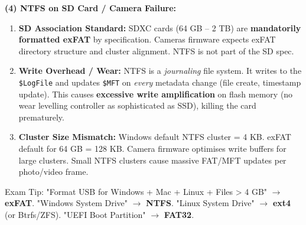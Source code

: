 \documentclass[11pt]{article}
\newcommand{\cle}[1]{{\popxbold\color{popdark}#1}}
\begin{document}
\begin{exoresolu}
\noindent\textbf{(4) NTFS on SD Card / Camera Failure:}
\begin{enumerate}
    \item \textbf{SD Association Standard:} SDXC cards (64 GB -- 2 TB) are \textbf{mandatorily formatted exFAT} by specification. Cameras firmware expects exFAT directory structure and cluster alignment. NTFS is not part of the SD spec.
    \item \textbf{Write Overhead / Wear:} NTFS is a \emph{journaling} file system. It writes to the \texttt{\$LogFile} and updates \texttt{\$MFT} on \emph{every} metadata change (file create, timestamp update). This causes \textbf{excessive write amplification} on flash memory (no wear levelling controller as sophisticated as SSD), killing the card prematurely.
    \item \textbf{Cluster Size Mismatch:} Windows default NTFS cluster = 4 KB. exFAT default for 64 GB = 128 KB. Camera firmware optimises write buffers for large clusters. Small NTFS clusters cause massive FAT/MFT updates per photo/video frame.
\end{enumerate}

\cle{Exam Tip:} "Format USB for Windows + Mac + Linux + Files > 4 GB" $\rightarrow$ \textbf{exFAT}. "Windows System Drive" $\rightarrow$ \textbf{NTFS}. "Linux System Drive" $\rightarrow$ \textbf{ext4} (or Btrfs/ZFS). "UEFI Boot Partition" $\rightarrow$ \textbf{FAT32}.
\end{exoresolu}
\end{document}
